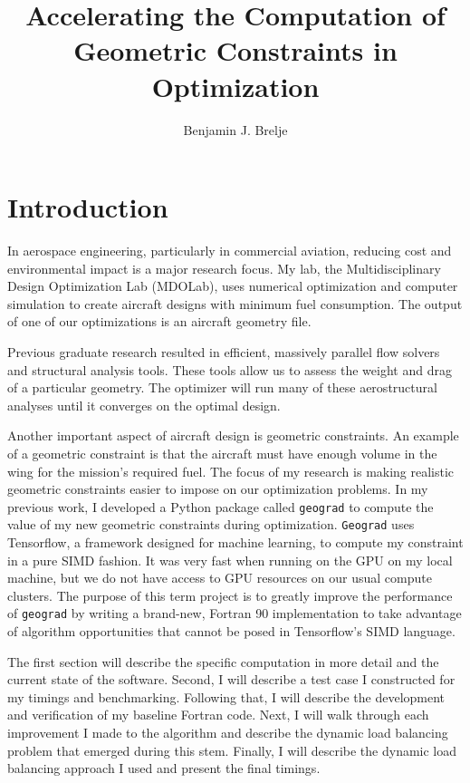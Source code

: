 \documentclass[11pt,letterpaper]{article}
\title{Accelerating the Computation of Geometric Constraints in Optimization}
\author{Benjamin J. Brelje}
\begin{document}
\maketitle

\section{Introduction}
\qquad In aerospace engineering, particularly in commercial aviation, reducing cost and environmental impact is a major research focus.
My lab, the Multidisciplinary Design Optimization Lab (MDOLab), uses numerical optimization and computer simulation to create aircraft designs with minimum fuel consumption.
The output of one of our optimizations is an aircraft geometry file.

\qquad Previous graduate research resulted in efficient, massively parallel flow solvers and structural analysis tools.
These tools allow us to assess the weight and drag of a particular geometry.
The optimizer will run many of these aerostructural analyses until it converges on the optimal design.

\qquad Another important aspect of aircraft design is geometric constraints.
An example of a geometric constraint is that the aircraft must have enough volume in the wing for the mission's required fuel.
The focus of my research is making realistic geometric constraints easier to impose on our optimization problems.
In my previous work, I developed a Python package called \texttt{geograd} to compute the value of my new geometric constraints during optimization.
\texttt{Geograd} uses Tensorflow, a framework designed for machine learning, to compute my constraint in a pure SIMD fashion.
It was very fast when running on the GPU on my local machine, but we do not have access to GPU resources on our usual compute clusters.
The purpose of this term project is to greatly improve the performance of \texttt{geograd} by writing a brand-new, Fortran 90 implementation to take advantage of algorithm opportunities that cannot be posed in Tensorflow's SIMD language.

\qquad The first section will describe the specific computation in more detail and the current state of the software.
Second, I will describe a test case I constructed for my timings and benchmarking.
Following that, I will describe the development and verification of my baseline Fortran code.
Next, I will walk through each improvement I made to the algorithm and describe the dynamic load balancing problem that emerged during this stem.
Finally, I will describe the dynamic load balancing approach I used and present the final timings.
\end{document}
